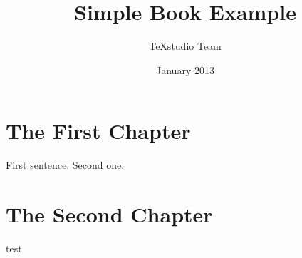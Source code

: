 \documentclass[a4paper,12pt]{book}
\begin{document}
\author{TeXstudio Team}
\title{Simple Book Example}
\date{January 2013}

\frontmatter
\maketitle
\tableofcontents

\mainmatter
\chapter{The First Chapter}
First sentence. Second one.
\chapter{The Second Chapter}
test

\backmatter
\end{document}
